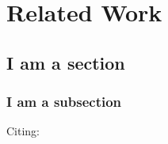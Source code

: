 \chapter{Related Work}


\section{I am a section}



\subsection{I am a subsection}

Citing: \cite{Sample2016}


